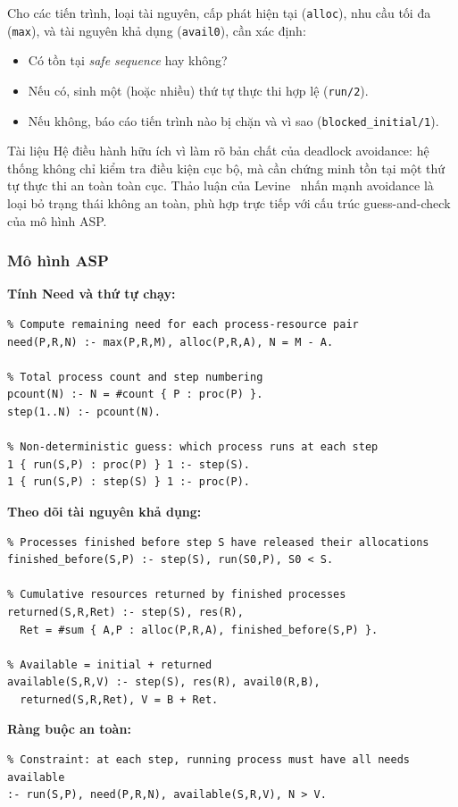 \documentclass[a4paper,11pt]{article}
\begin{document}
Cho các tiến trình, loại tài nguyên, cấp phát hiện tại (\texttt{alloc}), nhu cầu tối đa (\texttt{max}),
và tài nguyên khả dụng (\texttt{avail0}), cần xác định:
\begin{itemize}
  \item Có tồn tại \textit{safe sequence} hay không?
  \item Nếu có, sinh một (hoặc nhiều) thứ tự thực thi hợp lệ (\texttt{run/2}).
  \item Nếu không, báo cáo tiến trình nào bị chặn và vì sao (\texttt{blocked\_initial/1}).
\end{itemize}

Tài liệu Hệ điều hành hữu ích vì làm rõ bản chất của deadlock avoidance: hệ thống không chỉ kiểm tra
điều kiện cục bộ, mà cần chứng minh tồn tại một thứ tự thực thi an toàn toàn cục. Thảo luận của Levine~\cite{Levine2005}
nhấn mạnh avoidance là loại bỏ trạng thái không an toàn, phù hợp trực tiếp với cấu trúc guess-and-check của mô hình ASP.

\subsubsection*{Mô hình ASP}

\textbf{Tính Need và thứ tự chạy:}
\begin{lstlisting}
% Compute remaining need for each process-resource pair
need(P,R,N) :- max(P,R,M), alloc(P,R,A), N = M - A.

% Total process count and step numbering
pcount(N) :- N = #count { P : proc(P) }.
step(1..N) :- pcount(N).

% Non-deterministic guess: which process runs at each step
1 { run(S,P) : proc(P) } 1 :- step(S).
1 { run(S,P) : step(S) } 1 :- proc(P).
\end{lstlisting}

\textbf{Theo dõi tài nguyên khả dụng:}
\begin{lstlisting}
% Processes finished before step S have released their allocations
finished_before(S,P) :- step(S), run(S0,P), S0 < S.

% Cumulative resources returned by finished processes
returned(S,R,Ret) :- step(S), res(R), 
  Ret = #sum { A,P : alloc(P,R,A), finished_before(S,P) }.

% Available = initial + returned
available(S,R,V) :- step(S), res(R), avail0(R,B), 
  returned(S,R,Ret), V = B + Ret.
\end{lstlisting}

\textbf{Ràng buộc an toàn:}
\begin{lstlisting}
% Constraint: at each step, running process must have all needs available
:- run(S,P), need(P,R,N), available(S,R,V), N > V.
\end{lstlisting}
\end{document}
